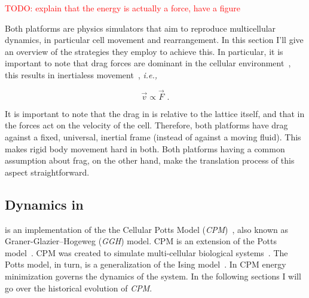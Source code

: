 
\textcolor{red}{TODO: explain that the energy is actually a force, have a figure}

Both platforms are physics simulators that aim to reproduce multicellular dynamics,
in particular cell movement and rearrangement.
In this section I'll give an overview of the strategies they employ to achieve this. In particular, it is important to note that drag forces are dominant in the cellular environment~\cite{ghaffarizadeh_physicell_2018}, this results in inertialess movement~\cite{ghaffarizadeh_physicell_2018}, \textit{i.e.,}  


\begin{equation}\label{eq:abm:aristotle-said-nothing-wrong}
    \Vec{v} \propto \Vec{F}\,\,.
\end{equation}


It is important to note that the drag in \ccds is relative to the lattice itself, and that in \pscs the forces act on the velocity of the cell. Therefore, both platforms have drag against a fixed, universal, inertial frame (instead of against a moving fluid). This makes rigid body movement hard in both. Both platforms having a common assumption about frag, on the other hand, make the translation process of this aspect straightforward.


\subsection{Dynamics in \ccd}\label{sec:abm:cpm-history}

\ccds is an implementation of the the Cellular Potts Model (\textit{CPM})~\cite{graner1992simulation, savill_modelling_1997}, also known as Graner-Glazier–Hogeweg (\textit{GGH}) model. CPM is an extension of the Potts model~\cite{potts1952some}. CPM was created to simulate multi-cellular biological systems~\cite{graner1992simulation}. The Potts model, in turn, is a generalization of the Ising model~\cite{ising1925beitrag}. In CPM energy minimization governs the dynamics of the system.
In the following sections I will go over the historical evolution of \textit{CPM}.

